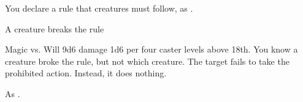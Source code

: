 \begin{spellheader}
    \spelldur{\durshort}
\end{spellheader}
\begin{spelleffects}
    \spelleffect You declare a rule that creatures must follow, as .
    \begin{spelltrigger}{A creature breaks the rule}
        \begin{spellattack}{Magic vs. Will}
            \spelleffect 9d6 damage \add 1d6 per four caster levels above 18th. You know a creature broke the rule, but not which creature.
            \spellsuccess The target fails to take the prohibited action. Instead, it does nothing.
        \end{spellattack}
    \end{spelltrigger}
\end{spelleffects}
\begin{spellfooter}
    \spellnotes As .
\end{spellfooter}

